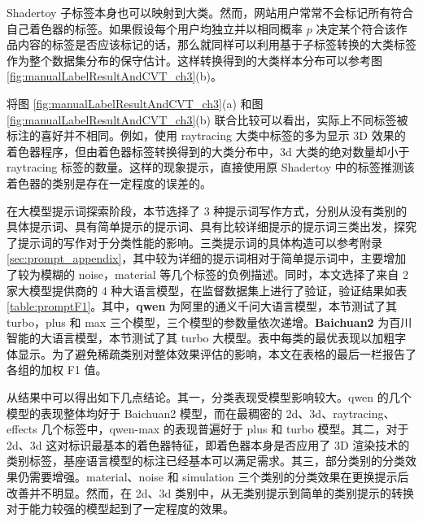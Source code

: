 {\added Shadertoy 子标签本身也可以映射到大类。然而，网站用户常常不会标记所有符合自己着色器的标签。如果假设每个用户均独立并以相同概率 $p$ 决定某个符合该作品内容的标签是否应该标记的话，那么就同样可以利用基于子标签转换的大类标签作为整个数据集分布的保守估计。这样转换得到的大类样本分布可以参考图 \ref{fig:manualLabelResultAndCVT_ch3}(b)。

将图 \ref{fig:manualLabelResultAndCVT_ch3}(a) 和图 \ref{fig:manualLabelResultAndCVT_ch3}(b) 联合比较可以看出，实际上不同标签被标注的喜好并不相同。例如，使用 raytracing 大类中标签的多为显示 3D 效果的着色器程序，但由着色器标签转换得到的大类分布中，3d 大类的绝对数量却小于 raytracing 标签的数量。这样的现象提示，直接使用原 Shadertoy 中的标签推测该着色器的类别是存在一定程度的误差的。

在大模型提示词探索阶段，本节选择了 3 种提示词写作方式，分别从没有类别的具体提示词、具有简单提示的提示词、具有比较详细提示的提示词三类出发，探究了提示词的写作对于分类性能的影响。三类提示词的具体构造可以参考附录 \ref{sec:prompt_appendix}，其中较为详细的提示词相对于简单提示词中，主要增加了较为模糊的 noise，material 等几个标签的负例描述。同时，本文选择了来自 2 家大模型提供商的 4 种大语言模型，在监督数据集上进行了验证，验证结果如表 \ref{table:promptF1}。其中，{\bf qwen} 为阿里的通义千问大语言模型\cite{QWen}，本节测试了其 turbo，plus 和 max 三个模型，三个模型的参数量依次递增。{\bf Baichuan2} 为百川智能的大语言模型\cite{Baichuan}，本节测试了其 turbo 大模型。表中每类的最优表现以加粗字体显示。为了避免稀疏类别对整体效果评估的影响，本文在表格的最后一栏报告了各组的加权 F1 值。

从结果中可以得出如下几点结论。其一，分类表现受模型影响较大。qwen 的几个模型的表现整体均好于 Baichuan2 模型，而在最稠密的 2d、3d、raytracing、effects 几个标签中，qwen-max 的表现普遍好于 plus 和 turbo 模型。其二，对于 2d、3d 这对标识最基本的着色器特征，即着色器本身是否应用了 3D 渲染技术的类别标签，基座语言模型的标注已经基本可以满足需求。其三，部分类别的分类效果仍需要增强。material、noise 和 simulation 三个类别的分类效果在更换提示后改善并不明显。然而，在 2d、3d 类别中，从无类别提示到简单的类别提示的转换对于能力较强的模型起到了一定程度的效果。

}

